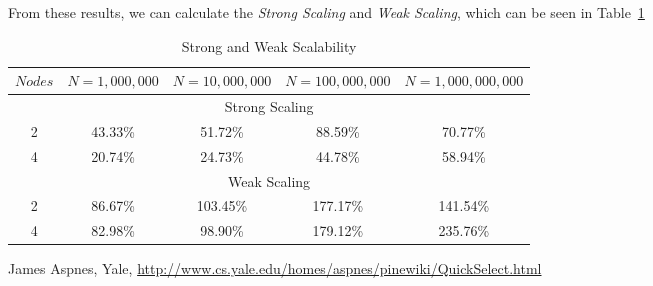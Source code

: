 \documentclass[addpoints]{exam}
\begin{document}
\begin{questions}
\begin{solution}
From these results, we can calculate the {\em Strong Scaling} and {\em Weak Scaling}, which can be seen in Table~\ref{table:scaling}

\begin{table}[H]
\centering
\caption{Strong and Weak Scalability}
\begin{tabular}{c c c c c}
\hline\hline
$Nodes$ & $N = 1,000,000$ & $N = 10,000,000$ & $N = 100,000,000$ & $N = 1,000,000,000$\\
\hline
\multicolumn{5}{c}{Strong Scaling}\\
\hline
2 & 43.33\% & \phantom{1}51.72\% & \phantom{1}88.59\% & \phantom{1}70.77\%\\
4 & 20.74\% & \phantom{1}24.73\% & \phantom{1}44.78\% & \phantom{1}58.94\%\\
\hline
\multicolumn{5}{c}{Weak Scaling}\\
\hline
2 & 86.67\% & 103.45\% & 177.17\% & 141.54\%\\
4 & 82.98\% & \phantom{1}98.90\% & 179.12\% & 235.76\%\\
\hline\hline
\end{tabular}
\label{table:scaling}
\end{table}
\end{solution}

\end{questions}
\begin{thebibliography}{99}
James Aspnes, Yale, \url{http://www.cs.yale.edu/homes/aspnes/pinewiki/QuickSelect.html}
\end{thebibliography}
\end{document}
